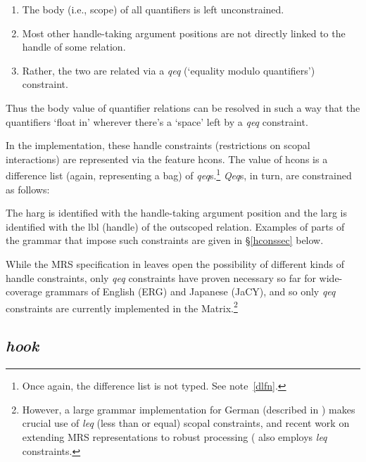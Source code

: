 \documentclass[12pt]{article}
\newcommand{\es}{\enumsentence}
\newcommand{\fn}{\footnote}
\begin{document}
\begin{enumerate}
\item The {\sc body} (i.e., scope) of all quantifiers is left unconstrained.
\item Most other handle-taking argument positions are not directly linked 
to the handle of some relation.
\item Rather, the two are related via a {\it qeq} (`equality modulo 
quantifiers') constraint.
\end{enumerate}

\noindent
Thus the {\sc body} value of quantifier relations can be resolved in
such a way that the quantifiers `float in' wherever there's a `space'
left by a {\it qeq} constraint.

In the implementation, these handle constraints (restrictions on scopal
interactions) are represented via the feature {\sc
hcons}.  The value of {\sc hcons} is a difference list (again,
representing a bag) of {\it qeq}s.\fn{Once again, the difference list
is not typed.  See note~\ref{dlfn}.}  {\it Qeq}s, in turn, are
constrained as follows:

\es{
\begin{avm}
{\it qeq}: \[ harg & handle\\
	      larg & handle \]
\end{avm}
}

\noindent
The {\sc harg} is identified with the handle-taking argument position
and the {\sc larg} is identified with the {\sc lbl} (handle) of the outscoped
relation.  Examples of parts of the grammar that impose such constraints
are given in \S\ref{hconssec} below.

While the MRS specification in  leaves
open the possibility of different kinds of handle constraints, only
{\it qeq} constraints have proven necessary so far for wide-coverage
grammars of English (ERG) and Japanese (JaCY), and so only
{\it qeq} constraints are currently implemented in the 
Matrix.\footnote{However, a large grammar implementation for German 
(described in )
makes crucial use of {\it leq} (less than or equal) scopal
constraints, and recent work on extending MRS representations to robust 
processing ( also employs {\it leq} constraints.}

\subsection{{\it hook}}
\label{hooksec}
\end{document}
